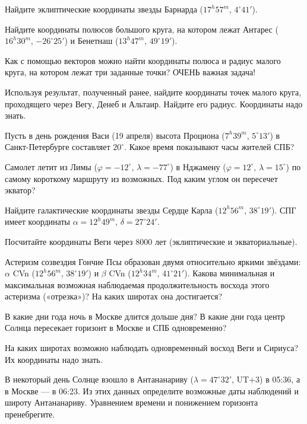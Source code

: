 \documentclass[14pt]{extarticle}
\newcommand{\titleofbase}{\header{Базовые задачи}}
\newcommand{\titleoflts}{\header{Задачи с УТС}}
\begin{document}
\pageheader
\titleofbase
{} Найдите эклиптические координаты звезды Барнарда ($17^h 57^m$, $4^\circ 41'$).

 Найдите координаты полюсов большого круга, на котором лежат Антарес ($16^h 30^m$, $-26^\circ 25'$) и Бенетнаш ($13^h 47^m$, $49^\circ 19'$).

 Как с помощью векторов можно найти координаты полюса и радиус малого круга, на котором лежат три заданные точки? ОЧЕНЬ важная задача!

 Используя результат, полученный ранее, найдите координаты точек малого круга, проходящего через Вегу, Денеб и Альтаир. Найдите его радиус. Координаты надо знать.

 Пусть в день рождения Васи (19 апреля) высота Проциона ($7^h 39^m$, $5^\circ 13'$) в Санкт-Петербурге составляет $20^\circ$. Какое время показывают часы жителей СПБ?

 Самолет летит из Лимы ($\varphi =-12^\circ$, $\lambda=-77^\circ$) в Нджамену ($\varphi =12^\circ$, $\lambda=15^\circ$) по самому короткому маршруту из возможных. Под каким углом он пересечет экватор?

 Найдите галактические координаты звезды Сердце Карла ($12^h 56^m$, $38^\circ 19'$). СПГ имеет координаты $\alpha = 12^h 49^m$, $\delta = 27^\circ 24'$.

 Посчитайте координаты Веги через 8000 лет (эклиптические и экваториальные).

\titleoflts

Астеризм созвездия Гончие Псы образован
двумя относительно яркими звёздами: $\alpha$ CVn ($12^h 56^m$, $38^\circ 19'$)
и $\beta$ CVn ($12^h 34^m$, $41^\circ 21'$). Какова
минимальная и максимальная возможная наблюдаемая продолжительность восхода этого астеризма («отрезка»)? На каких широтах
она достигается?

В какие дни года ночь в Москве длится дольше дня? В какие дни года центр Солнца пересекает горизонт в Москве и СПБ одновременно?

На каких широтах возможно наблюдать одновременный восход Веги и Сириуса? Их координаты надо знать.

В некоторый день Солнце взошло в Антананариву ($\lambda = 47^\circ 32'$, UT+3)
	в 05:36, а в Москве --- в 06:23.
	Из этих данных определите возможные даты наблюдений и широту
	Антананариву. Уравнением времени и понижением горизонта пренебрегите.
\end{document}
